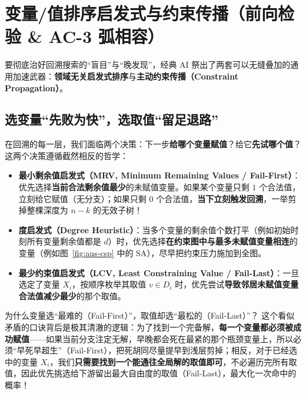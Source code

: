 \section{变量/值排序启发式与约束传播（前向检验 \& AC-3 弧相容）}\label{sec:csp-prop}

要彻底治好回溯搜索的“盲目”与“晚发现”，经典 AI 祭出了两套可以无缝叠加的通用加速武器：\textbf{领域无关启发式排序}与\textbf{主动约束传播（Constraint Propagation）}。

\subsection{选变量“先败为快”，选取值“留足退路”}

在回溯的每一层，我们面临两个决策：下一步\textbf{给哪个变量赋值}？给它\textbf{先试哪个值}？这两个决策遵循截然相反的哲学：
\begin{itemize}
  \item \textbf{最小剩余值启发式（MRV, Minimum Remaining Values / Fail-First）}：优先选择\textbf{当前合法剩余值最少}的未赋值变量。如果某个变量只剩 $1$ 个合法值，立刻给它赋值（无分支）；如果只剩 $0$ 个合法值，\textbf{当下立刻触发回溯}，一举剪掉整棵深度为 $n-k$ 的无效子树！
  \item \textbf{度启发式（Degree Heuristic）}：当多个变量的剩余值个数打平（例如初始时刻所有变量剩余值都是 $d$）时，优先选择\textbf{在约束图中与最多未赋值变量相连}的变量（例如图~\ref{fig:aus-csp} 中的 \textsf{SA}），尽早把约束压力施加到全图。
  \item \textbf{最少约束值启发式（LCV, Least Constraining Value / Fail-Last）}：一旦选定了变量 $X_i$，按顺序枚举其取值 $v \in D_i$ 时，优先尝试\textbf{导致邻居未赋值变量合法值减少最少}的那个取值。
\end{itemize}

\begin{insightBox}{为什么变量选“最难的（Fail-First）”，取值却选“最松的（Fail-Last）”？}
这个看似矛盾的口诀背后是极其清澈的逻辑：为了找到一个完备解，\textbf{每一个变量都必须被成功赋值}——如果当前分支注定无解，早晚都会死在最紧的那个瓶颈变量上，所以必须“早死早超生”（Fail-First），把死胡同尽量提早到浅层剪掉；相反，对于已经选中的变量 $X_i$，我们\textbf{只需要找到一个能通往全局解的取值即可}，不必遍历完所有取值，因此优先挑选给下游留出最大自由度的取值（Fail-Last），最大化一次命中的概率！
\end{insightBox}

